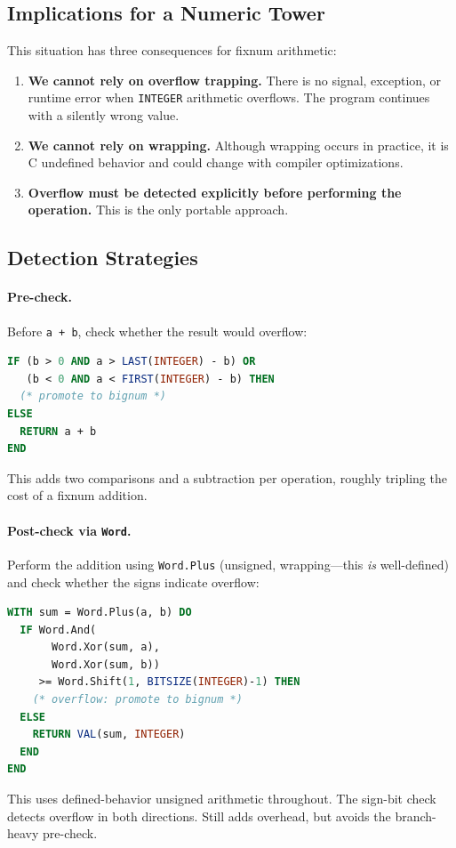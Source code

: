 \documentclass[12pt]{report}
\begin{document}
\subsection{Implications for a Numeric Tower}

This situation has three consequences for fixnum arithmetic:

\begin{enumerate}
\item \textbf{We cannot rely on overflow trapping.}
  There is no signal, exception, or runtime error when {\tt INTEGER}
  arithmetic overflows.  The program continues with a silently wrong
  value.

\item \textbf{We cannot rely on wrapping.}
  Although wrapping occurs in practice, it is C undefined behavior
  and could change with compiler optimizations.

\item \textbf{Overflow must be detected explicitly before
  performing the operation.}
  This is the only portable approach.
\end{enumerate}

\subsection{Detection Strategies}

\paragraph{Pre-check.}
Before {\tt a + b}, check whether the result would overflow:
\begin{lstlisting}[language=Modula3]
IF (b > 0 AND a > LAST(INTEGER) - b) OR
   (b < 0 AND a < FIRST(INTEGER) - b) THEN
  (* promote to bignum *)
ELSE
  RETURN a + b
END
\end{lstlisting}
This adds two comparisons and a subtraction per operation, roughly
tripling the cost of a fixnum addition.

\paragraph{Post-check via {\tt Word}.}
Perform the addition using {\tt Word.Plus} (unsigned, wrapping---this
\emph{is} well-defined) and check whether the signs indicate overflow:
\begin{lstlisting}[language=Modula3]
WITH sum = Word.Plus(a, b) DO
  IF Word.And(
       Word.Xor(sum, a),
       Word.Xor(sum, b))
     >= Word.Shift(1, BITSIZE(INTEGER)-1) THEN
    (* overflow: promote to bignum *)
  ELSE
    RETURN VAL(sum, INTEGER)
  END
END
\end{lstlisting}
This uses defined-behavior unsigned arithmetic throughout.  The
sign-bit check detects overflow in both directions.  Still adds
overhead, but avoids the branch-heavy pre-check.
\end{document}
